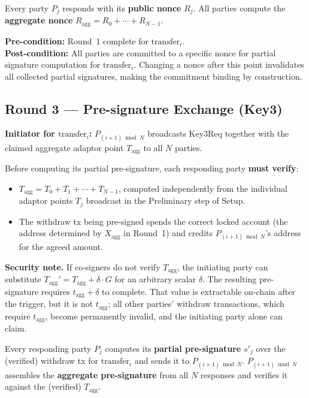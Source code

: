 \documentclass[11pt,a4paper,dvipsnames]{article}
\newcommand{\msg}[1]{\textsf{#1}}
\newcommand{\tagg}{t_{\mathrm{agg}}}
\newcommand{\Tagg}{T_{\mathrm{agg}}}
\newcommand{\Xagg}{X_{\mathrm{agg}}}
\newcommand{\Ragg}{R_{\mathrm{agg}}}
\begin{document}
Every party $P_j$ responds with its \textbf{public nonce} $R_j$.
All parties compute the \textbf{aggregate nonce}
$\Ragg = R_0 + \cdots + R_{N-1}$.

\noindent\textbf{Pre-condition:} Round~1 complete for $\mathrm{transfer}_i$.\\
\textbf{Post-condition:} All parties are committed to a specific nonce for
partial signature computation for $\mathrm{transfer}_i$.
Changing a nonce after this point invalidates all collected partial
signatures, making the commitment binding by construction.

\subsection{Round 3 — Pre-signature Exchange (\msg{Key3})}

\textbf{Initiator for $\mathrm{transfer}_i$:}
$P_{(i+1)\bmod N}$ broadcasts \msg{Key3Req} together with the claimed
aggregate adaptor point $\Tagg$ to all $N$ parties.

Before computing its partial pre-signature, each responding party
\textbf{must verify}:
\begin{itemize}
  \item $\Tagg = T_0 + T_1 + \cdots + T_{N-1}$, computed independently
    from the individual adaptor points $T_j$ broadcast in the Preliminary
    step of Setup.
  \item The withdraw tx being pre-signed spends the correct locked account
    (the address determined by $\Xagg$ in Round~1) and credits
    $P_{(i+1)\bmod N}$'s address for the agreed amount.
\end{itemize}

\noindent\textbf{Security note.}\;
If co-signers do not verify $\Tagg$, the initiating party can substitute
$\Tagg' = \Tagg + \delta \cdot G$ for an arbitrary scalar $\delta$.
The resulting pre-signature requires $\tagg + \delta$ to complete.
That value is extractable on-chain after the trigger, but it is not
$\tagg$; all other parties' withdraw transactions, which require $\tagg$,
become permanently invalid, and the initiating party alone can claim.

Every responding party $P_j$ computes its \textbf{partial pre-signature}
$s'_j$ over the (verified) withdraw tx for $\mathrm{transfer}_i$ and sends
it to $P_{(i+1)\bmod N}$.
$P_{(i+1)\bmod N}$ assembles the \textbf{aggregate pre-signature} from all
$N$ responses and verifies it against the (verified) $\Tagg$.
\end{document}
